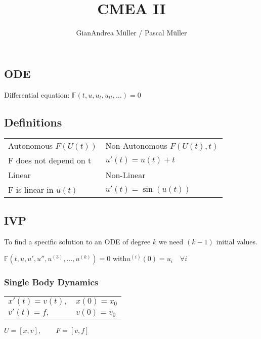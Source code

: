 \documentclass[10pt,a4paper]{scrartcl}
\author{GianAndrea Müller / Pascal Müller}
\title{CMEA II}
\begin{document}
\begin{multicols*}{3}
\maketitle
\small
\tableofcontents
\normalsize
\end{multicols*}

\newpage

\begin{multicols*}{3}

\section{ODE}

Differential equation: $\mathbb{F}\left(t,u,u_t,u_{tt},\ldots\right)=0$

\subsection{Definitions}

\begin{tabular}{ll}
Autonomous $F(U(t))$ &Non-Autonomous $F(U(t),t)$\\
F does not depend on t& $u'(t)=u(t)+t$\\
\hline
Linear & Non-Linear\\
F is linear in $u(t)$&$u'(t)=\sin(u(t))$
\end{tabular}

\subsection{IVP}

To find a specific solution to an ODE of degree $k$ we need $(k-1)$ initial values.

$\mathbb{F}\left(t,u,u',u'',u^{(3)},\ldots,u^{(k)}\right)=0$ \hfill with\hfill $u^{(i)}(0)=u_{i}\quad\forall i$

\subsubsection{Single Body Dynamics}

\begin{tabular}{ll}
$x'(t)=v(t),$&$x(0)=x_0$\\
$v'(t)=f,$&$v(0)=v_0$
\end{tabular}

\begin{center}$U=[x,v],\qquad F=[v,f]$


\end{center}
\end{multicols*}
\end{document}
